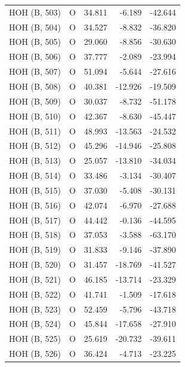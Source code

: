\begin{longtable}{@{}lcrr@{}}
  \cmidrule(r){1-5}
  HOH (B, 503) & O & 34.811 & -6.189 & -42.644 \\
  \cmidrule(r){1-5}
  HOH (B, 504) & O & 34.527 & -8.832 & -36.820 \\
  \cmidrule(r){1-5}
  HOH (B, 505) & O & 29.060 & -8.856 & -30.630 \\
  \cmidrule(r){1-5}
  HOH (B, 506) & O & 37.777 & -2.089 & -23.994 \\
  \cmidrule(r){1-5}
  HOH (B, 507) & O & 51.094 & -5.644 & -27.616 \\
  \cmidrule(r){1-5}
  HOH (B, 508) & O & 40.381 & -12.926 & -19.509 \\
  \cmidrule(r){1-5}
  HOH (B, 509) & O & 30.037 & -8.732 & -51.178 \\
  \cmidrule(r){1-5}
  HOH (B, 510) & O & 42.367 & -8.630 & -45.447 \\
  \cmidrule(r){1-5}
  HOH (B, 511) & O & 48.993 & -13.563 & -24.532 \\
  \cmidrule(r){1-5}
  HOH (B, 512) & O & 45.296 & -14.946 & -25.808 \\
  \cmidrule(r){1-5}
  HOH (B, 513) & O & 25.057 & -13.810 & -34.034 \\
  \cmidrule(r){1-5}
  HOH (B, 514) & O & 33.486 & -3.134 & -30.407 \\
  \cmidrule(r){1-5}
  HOH (B, 515) & O & 37.030 & -5.408 & -30.131 \\
  \cmidrule(r){1-5}
  HOH (B, 516) & O & 42.074 & -6.970 & -27.688 \\
  \cmidrule(r){1-5}
  HOH (B, 517) & O & 44.442 & -0.136 & -44.595 \\
  \cmidrule(r){1-5}
  HOH (B, 518) & O & 37.053 & -3.588 & -63.170 \\
  \cmidrule(r){1-5}
  HOH (B, 519) & O & 31.833 & -9.146 & -37.890 \\
  \cmidrule(r){1-5}
  HOH (B, 520) & O & 31.457 & -18.769 & -41.527 \\
  \cmidrule(r){1-5}
  HOH (B, 521) & O & 46.185 & -13.714 & -23.329 \\
  \cmidrule(r){1-5}
  HOH (B, 522) & O & 41.741 & -1.509 & -17.618 \\
  \cmidrule(r){1-5}
  HOH (B, 523) & O & 52.459 & -5.796 & -43.718 \\
  \cmidrule(r){1-5}
  HOH (B, 524) & O & 45.844 & -17.658 & -27.910 \\
  \cmidrule(r){1-5}
  HOH (B, 525) & O & 25.619 & -20.732 & -39.611 \\
  \cmidrule(r){1-5}
  HOH (B, 526) & O & 36.424 & -4.713 & -23.225 \\

\end{longtable}
